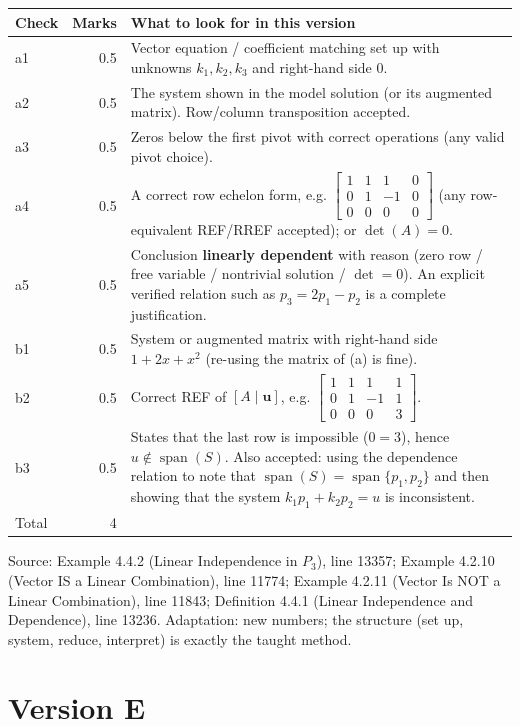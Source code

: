 \documentclass[11pt,a4paper]{article}
\newcommand{\Src}[1]{{\footnotesize\color{black!65}Source: #1}}
\begin{document}
\begin{tabularx}{\linewidth}{@{}l r >{\raggedright\arraybackslash}X@{}}\toprule Check & Marks & What to look for in this version\\\midrule
a1 & 0.5 & Vector equation / coefficient matching set up with unknowns $k_1,k_2,k_3$ and right-hand side $0$.\\
a2 & 0.5 & The system shown in the model solution (or its augmented matrix). Row/column transposition accepted.\\
a3 & 0.5 & Zeros below the first pivot with correct operations (any valid pivot choice).\\
a4 & 0.5 & A correct row echelon form, e.g. $\left[\begin{array}{ccc|c} 1 & 1 & 1 & 0 \\ 0 & 1 & -1 & 0 \\ 0 & 0 & 0 & 0 \end{array}\right]$ (any row-equivalent REF/RREF accepted); or $\det(A)=0$.\\
a5 & 0.5 & Conclusion \textbf{linearly dependent} with reason (zero row / free variable / nontrivial solution / $\det=0$). An explicit verified relation such as $p_3=2p_1-p_2$ is a complete justification.\\
b1 & 0.5 & System or augmented matrix with right-hand side $1+2x+x^{2}$ (re-using the matrix of (a) is fine).\\
b2 & 0.5 & Correct REF of $[A\mid\mathbf{u}]$, e.g. $\left[\begin{array}{ccc|c} 1 & 1 & 1 & 1 \\ 0 & 1 & -1 & 1 \\ 0 & 0 & 0 & 3 \end{array}\right]$.\\
b3 & 0.5 & States that the last row is impossible ($0=3$), hence $u\notin\operatorname{span}(S)$. Also accepted: using the dependence relation to note that $\operatorname{span}(S)=\operatorname{span}\{p_1,p_2\}$ and then showing that the system $k_1p_1+k_2p_2=u$ is inconsistent.\\
\midrule Total & 4 & \\\bottomrule\end{tabularx}
\Src{Example 4.4.2 (Linear Independence in $P_3$), line 13357; Example 4.2.10 (Vector IS a Linear Combination), line 11774; Example 4.2.11 (Vector Is NOT a Linear Combination), line 11843; Definition 4.4.1 (Linear Independence and Dependence), line 13236. Adaptation: new numbers; the structure (set up, system, reduce, interpret) is exactly the taught method.}\par
\clearpage\section*{Version E}
\end{document}
